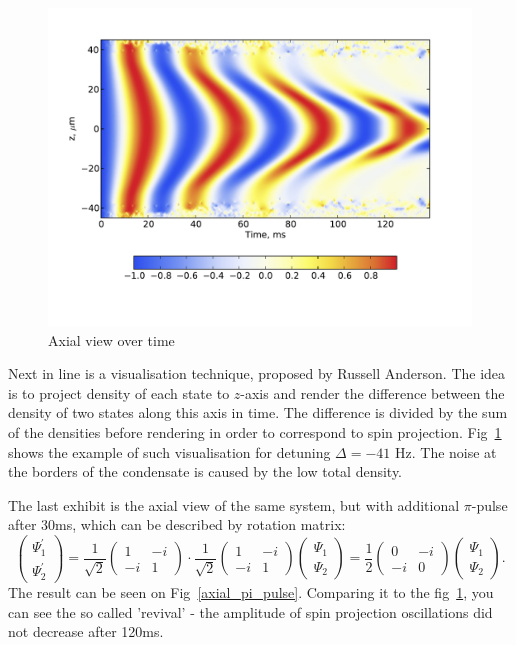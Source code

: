 \documentclass[12pt,notitlepage]{report}
\begin{document}
\begin{figure}
\includegraphics[width=5in]{axial_view.pdf}
\caption{Axial view over time}
\label{axial_view}
\end{figure}

Next in line is a visualisation technique, proposed by Russell Anderson. The idea is to project density of each state to $z$-axis and render the difference between the density of two states along this axis in time. The difference is divided by the sum of the densities before rendering in order to correspond to spin projection. Fig~\ref{axial_view} shows the example of such visualisation for detuning $\Delta = -41 \textrm{ Hz}$. The noise at the borders of the condensate is caused by the low total density.

The last exhibit is the axial view of the same system, but with additional $\pi$-pulse after 30ms, which can be described by rotation matrix:
\[
\begin{pmatrix}
	\Psi^\prime_1 \\	\Psi^\prime_2
\end{pmatrix} =
\frac{1}{\sqrt{2}} \begin{pmatrix}
	1 & -i \\ -i & 1
\end{pmatrix} \cdot
\frac{1}{\sqrt{2}} \begin{pmatrix}
	1 & -i \\ -i & 1
\end{pmatrix}
\begin{pmatrix}
	\Psi_1 \\ \Psi_2
\end{pmatrix} =
\frac{1}{2} \begin{pmatrix}
	0 & -i \\ -i & 0
\end{pmatrix}
\begin{pmatrix}
	\Psi_1 \\ \Psi_2
\end{pmatrix}.
\]
The result can be seen on Fig~\ref{axial_pi_pulse}. Comparing it to the fig~\ref{axial_view}, you can see the so called 'revival' - the amplitude of spin projection oscillations did not decrease after 120ms.
\end{document}
